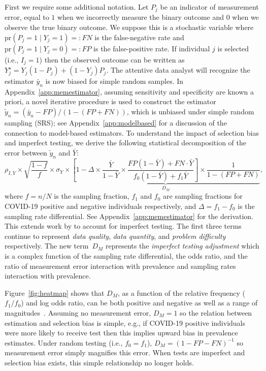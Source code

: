 \documentclass[11pt]{amsart}
\numberwithin{equation}{section}
\theoremstyle{plain}
\def\pr{\text{pr}}
\begin{document}
 First we require some additional notation.  Let $P_j$ be an indicator of measurement error, equal to $1$ when we incorrectly measure the binary outcome and $0$ when we observe the true binary outcome. We suppose this is a stochastic variable where $\pr(P_j = 1 \mid Y_j = 1) =: FN$ is the false-negative rate and $\pr(P_j = 1 \mid Y_j = 0) =: FP$ is the false-positive rate.  If individual $j$ is selected (i.e., $I_j = 1$) then the observed outcome can be written as $Y_j^{\star} = Y_j(1-P_j) + (1-Y_j) P_j$.  The attentive data analyst will recognize the estimator $\bar y_n$ is now biased for simple random samples.  In Appendix~\ref{app:memestimator}, assuming sensitivity and specificity are known a priori, a novel iterative procedure is used to construct the estimator $\tilde y_n = (\bar y_n - FP)/(1-(FP+FN))$, which is unbiased under simple random sampling (SRS); see Appendix~\ref{app:modelbased} for a discussion of the connection to model-based estimators. To understand the impact of selection bias and imperfect testing, we derive the following statistical decomposition of the error between $\tilde y_n$ and $\bar Y$:
 \begin{equation}
 \label{eq:statdecomp}
 \rho_{I,Y} \times \sqrt{\frac{1-f}{f}} \times \sigma_{Y}
 \times \underbrace{\left[ 1 - \Delta \times \frac{\bar Y}{1-\bar Y} \times \frac{FP(1-\bar Y) + FN \cdot \bar Y}{f_0 (1-\bar Y) + f_1 \bar Y} \right] \times \frac{1}{1-(FP+FN)}}_{D_M},
 \end{equation}
 where $f=n/N$ is the sampling fraction, $f_1$ and $f_0$ are sampling fractions for COVID-19 positive and negative individuals respectively, and $\Delta = f_1 - f_0$ is the sampling rate differential.  See Appendix~\ref{app:memestimator} for the derivation. This extends work by \cite{Meng2018} to account for imperfect testing. The first three terms continue to represent \emph{data quality}, \emph{data quantity}, and \emph{problem difficulty} respectively.  The new term~$D_M$ represents the \emph{imperfect testing adjustment} which is a complex function of the sampling rate differential, the odds ratio, and the ratio of measurement error interaction with prevalence and sampling rates interaction with prevalence. %

 Figure~\ref{fig:heatmap} shows that $D_M$, as a function of the relative frequency ($f_1/f_0$) and log odds ratio, can be both positive and negative as well as a range of magnitudes~\citep{Beesley2020,Beesley2019,Smeden2019}. Assuming no measurement error, $D_M = 1$ so the relation between estimation and selection bias is simple, e.g., if COVID-19 positive individuals were more likely to receive test then this implies upward bias in prevalence estimates. Under random testing (i.e., $f_0 = f_1$), $D_M = (1-FP-FN)^{-1}$ so measurement error simply magnifies this error. When tests are imperfect and selection bias exists, this simple relationship no longer holds.
\end{document}
